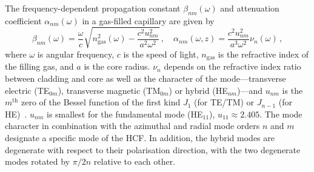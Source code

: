 \documentclass[amsmath, preprint, floatfix]{revtex4-2}
\begin{document}
The frequency-dependent propagation constant $\beta_{nm}(\omega)$ and attenuation coefficient $\alpha_{nm}(\omega)$ in a gas-filled capillary are given by
\begin{equation}
    \beta_{nm}(\omega) = \frac{\omega}{c}\sqrt{n_\mathrm{gas}^2(\omega) - \frac{c^2u_{nm}^2}{a^2\omega^2}}\,,
    \quad
    \alpha_{nm}(\omega, z) = \frac{c^2 u_{nm}^2}{a^3\omega^2} \nu_n(\omega)\,,
\end{equation}
where $\omega$ is angular frequency, $c$ is the speed of light, $n_\mathrm{gas}$ is the refractive index of the filling gas, and $a$ is the core radius. $\nu_n$ depends on the refractive index ratio between cladding and core as well as the character of the mode---transverse electric (TE$_{0m}$), transverse magnetic (TM$_{0m}$) or hybrid (HE$_{nm}$)---and $u_{nm}$ is the $m^\mathrm{th}$ zero of the Bessel function of the first kind $J_1$ (for TE/TM) or $J_{n-1}$ (for HE)~\cite{marcatili_hollow_1964}. $u_{nm}$ is smallest for the fundamental mode (HE$_{11}$), $u_{11} \approx 2.405$. The mode character in combination with the azimuthal and radial mode orders $n$ and $m$ designate a specific mode of the HCF. In addition, the hybrid modes are degenerate with respect to their polarisation direction, with the two degenerate modes rotated by $\pi/2n$ relative to each other.
\end{document}
